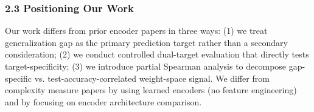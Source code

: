 \subsubsection{2.3 Positioning Our Work}

Our work differs from prior encoder papers in three ways: (1) we treat generalization gap as the primary
prediction target rather than a secondary consideration; (2) we conduct controlled dual-target evaluation
that directly tests target-specificity; (3) we introduce partial Spearman analysis to decompose
gap-specific vs. test-accuracy-correlated weight-space signal. We differ from complexity measure papers
by using learned encoders (no feature engineering) and by focusing on encoder architecture comparison.

